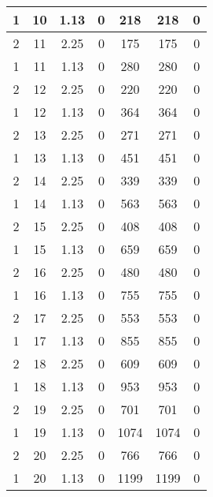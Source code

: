 \documentclass[letterpaper, 12pt]{article}
\begin{document}
\begin{longtable}{|c|c|c|c|c|c|c|}
\hline
1 & 10 & 1.13 & 0 & 218 & 218 & 0 \\
\hline
2 & 11 & 2.25 & 0 & 175 & 175 & 0 \\
\hline
1 & 11 & 1.13 & 0 & 280 & 280 & 0 \\
\hline
2 & 12 & 2.25 & 0 & 220 & 220 & 0 \\
\hline
1 & 12 & 1.13 & 0 & 364 & 364 & 0 \\
\hline
2 & 13 & 2.25 & 0 & 271 & 271 & 0 \\
\hline
1 & 13 & 1.13 & 0 & 451 & 451 & 0 \\
\hline
2 & 14 & 2.25 & 0 & 339 & 339 & 0 \\
\hline
1 & 14 & 1.13 & 0 & 563 & 563 & 0 \\
\hline
2 & 15 & 2.25 & 0 & 408 & 408 & 0 \\
\hline
1 & 15 & 1.13 & 0 & 659 & 659 & 0 \\
\hline
2 & 16 & 2.25 & 0 & 480 & 480 & 0 \\
\hline
1 & 16 & 1.13 & 0 & 755 & 755 & 0 \\
\hline
2 & 17 & 2.25 & 0 & 553 & 553 & 0 \\
\hline
1 & 17 & 1.13 & 0 & 855 & 855 & 0 \\
\hline
2 & 18 & 2.25 & 0 & 609 & 609 & 0 \\
\hline
1 & 18 & 1.13 & 0 & 953 & 953 & 0 \\
\hline
2 & 19 & 2.25 & 0 & 701 & 701 & 0 \\
\hline
1 & 19 & 1.13 & 0 & 1074 & 1074 & 0 \\
\hline
2 & 20 & 2.25 & 0 & 766 & 766 & 0 \\
\hline
1 & 20 & 1.13 & 0 & 1199 & 1199 & 0 \\
\hline
\end{longtable}
\end{document}

